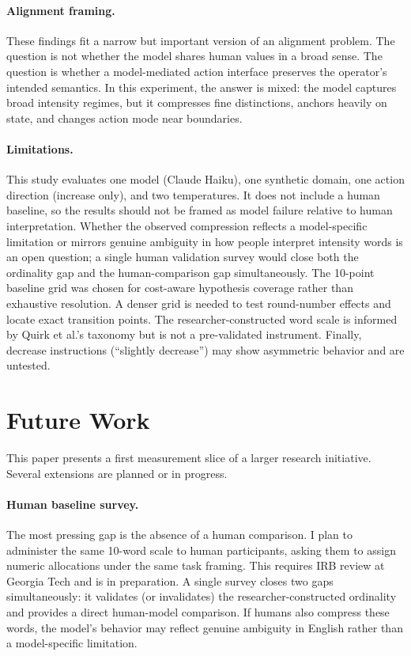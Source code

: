 \documentclass[11pt]{article}
\begin{document}
\paragraph{Alignment framing.}
These findings fit a narrow but important version of an alignment problem. The question is not whether the model shares human values in a broad sense. The question is whether a model-mediated action interface preserves the operator's intended semantics. In this experiment, the answer is mixed: the model captures broad intensity regimes, but it compresses fine distinctions, anchors heavily on state, and changes action mode near boundaries.

\paragraph{Limitations.}
This study evaluates one model (Claude Haiku), one synthetic domain, one action direction (increase only), and two temperatures. It does not include a human baseline, so the results should not be framed as model failure relative to human interpretation. Whether the observed compression reflects a model-specific limitation or mirrors genuine ambiguity in how people interpret intensity words is an open question; a single human validation survey would close both the ordinality gap and the human-comparison gap simultaneously. The 10-point baseline grid was chosen for cost-aware hypothesis coverage rather than exhaustive resolution. A denser grid is needed to test round-number effects and locate exact transition points. The researcher-constructed word scale is informed by Quirk et al.'s taxonomy but is not a pre-validated instrument. Finally, decrease instructions (``slightly decrease'') may show asymmetric behavior and are untested.

\section{Future Work}

This paper presents a first measurement slice of a larger research initiative. Several extensions are planned or in progress.

\paragraph{Human baseline survey.}
The most pressing gap is the absence of a human comparison. I plan to administer the same 10-word scale to human participants, asking them to assign numeric allocations under the same task framing. This requires IRB review at Georgia Tech and is in preparation. A single survey closes two gaps simultaneously: it validates (or invalidates) the researcher-constructed ordinality and provides a direct human-model comparison. If humans also compress these words, the model's behavior may reflect genuine ambiguity in English rather than a model-specific limitation.
\end{document}

